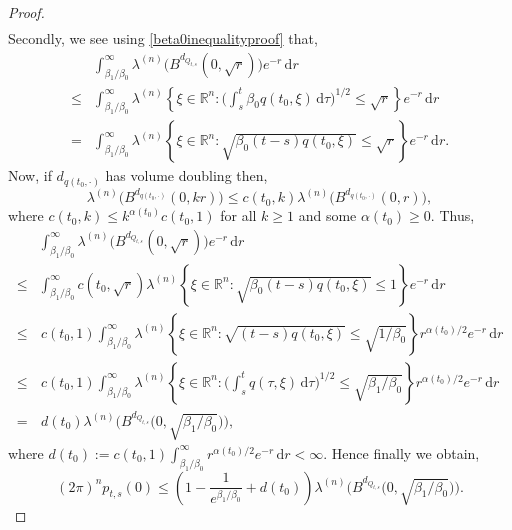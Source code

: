 \documentclass[a4paper, 12pt]{report}
\theoremstyle{cor}
\theoremstyle{remark}
\theoremstyle{definition}
\begin{document}
\begin{proof}
$$\begin{aligned}
\end{aligned}
$$
Secondly, we see using \eqref{beta0inequalityproof} that,
$$
\begin{aligned}
& \int_{\beta_1/\beta_0}^\infty\lambda^{(n)}\big(B^{d_{Q_{t, s}}}(0, \sqrt{r})\big)e^{-r}\,\mathrm{d}r\\
\le & \int_{\beta_1/\beta_0}^\infty\lambda^{(n)}\left\{\xi \in \mathbb{R}^n : \bigg(\int_s^t\beta_0q(t_0, \xi)\,\mathrm{d}\tau\bigg)^{1/2} \le \sqrt{r}\right\}e^{-r}\,\mathrm{d}r\\
= & \int_{\beta_1/\beta_0}^\infty\lambda^{(n)}\left\{\xi \in \mathbb{R}^n : \sqrt{\beta_0(t - s)q(t_0, \xi)} \le \sqrt{r}\right\}e^{-r}\,\mathrm{d}r.
\end{aligned}
$$
Now, if $d_{q(t_0, \cdot)}$ has volume doubling then,
$$
\lambda^{(n)}\big(B^{d_{q(t_0, \cdot)}}(0, kr)\big) \le c(t_0, k)\lambda^{(n)}\big(B^{d_{q(t_0, \cdot)}}(0, r)\big),
$$
where $c(t_0, k) \le k^{\alpha(t_0)}c(t_0, 1)$ for all $k \ge 1$ and some $\alpha(t_0) \ge 0$.  Thus,
$$
\begin{aligned}
& \int_{\beta_1/\beta_0}^\infty\lambda^{(n)}\big(B^{d_{Q_{t, s}}}(0, \sqrt{r})\big)e^{-r}\,\mathrm{d}r\\
\le & \int_{\beta_1/\beta_0}^\infty c(t_0, \sqrt{r})\lambda^{(n)}\left\{\xi \in \mathbb{R}^n : \sqrt{\beta_0(t - s)q(t_0, \xi)} \le 1\right\}e^{-r}\,\mathrm{d}r\\
\le & \, c(t_0, 1)\int_{\beta_1/\beta_0}^\infty\lambda^{(n)}\left\{\xi \in \mathbb{R}^n : \sqrt{(t - s)q(t_0, \xi)} \le \sqrt{1/\beta_0}\right\}r^{\alpha(t_0)/2}e^{-r}\,\mathrm{d}r\\
\le & \, c(t_0, 1)\int_{\beta_1/\beta_0}^\infty\lambda^{(n)}\left\{\xi \in \mathbb{R}^n : \bigg(\int_s^tq(\tau, \xi)\,\mathrm{d}\tau\bigg)^{1/2} \le \sqrt{\beta_1/\beta_0}\right\}r^{\alpha(t_0)/2}e^{-r}\,\mathrm{d}r\\
= & \, d(t_0)\lambda^{(n)}\Big(B^{d_{Q_{t, s}}}\big(0, \sqrt{\beta_1/\beta_0}\big)\Big),
\end{aligned}
$$
where $d(t_0) := c(t_0, 1)\int_{\beta_1/\beta_0}^\infty r^{\alpha(t_0)/2}e^{-r}\,\mathrm{d}r < \infty$.  Hence finally we obtain,
$$
(2\pi)^np_{t, s}(0) \le \left(1 - \frac{1}{e^{\beta_1/\beta_0}} + d(t_0)\right)\lambda^{(n)}\Big(B^{d_{Q_{t, s}}}\big(0, \sqrt{\beta_1/\beta_0}\big)\Big).
$$
\end{proof}
\end{document}
